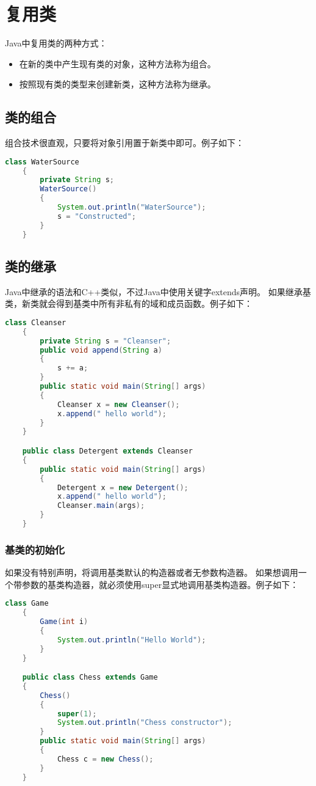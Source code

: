 \documentclass[a4paper,left=2.5cm,right=2.5cm,11pt]{article}
\begin{document}
\clearpage

\section{复用类}
	Java中复用类的两种方式：
	\begin{itemize}
		\item 在新的类中产生现有类的对象，这种方法称为组合。
		\item 按照现有类的类型来创建新类，这种方法称为继承。
	\end{itemize}

\subsection{类的组合}
	组合技术很直观，只要将对象引用置于新类中即可。例子如下：
	\begin{lstlisting}[language = Java]
	class WaterSource
	{
		private String s;
		WaterSource()
		{
			System.out.println("WaterSource");
			s = "Constructed";
		}
	}
	\end{lstlisting}

\subsection{类的继承}
	Java中继承的语法和C++类似，不过Java中使用关键字extends声明。
	如果继承基类，新类就会得到基类中所有非私有的域和成员函数。例子如下：
	\begin{lstlisting}[language = Java]
	class Cleanser
	{
		private String s = "Cleanser";
		public void append(String a)
		{
			s += a;
		}
		public static void main(String[] args)
		{
			Cleanser x = new Cleanser();
			x.append(" hello world");
		}
	}

	public class Detergent extends Cleanser
	{
		public static void main(String[] args)
		{
			Detergent x = new Detergent();
			x.append(" hello world");
			Cleanser.main(args);
		}
	}
	\end{lstlisting}

\subsubsection{基类的初始化}
	如果没有特别声明，将调用基类默认的构造器或者无参数构造器。
	如果想调用一个带参数的基类构造器，就必须使用super显式地调用基类构造器。例子如下：
	\begin{lstlisting}[language = Java]
	class Game
	{
		Game(int i)
		{
			System.out.println("Hello World");
		}
	}

	public class Chess extends Game
	{
		Chess()
		{
			super(1);
			System.out.println("Chess constructor");
		}
		public static void main(String[] args)
		{
			Chess c = new Chess();
		}
	}
	\end{lstlisting}
\end{document}
